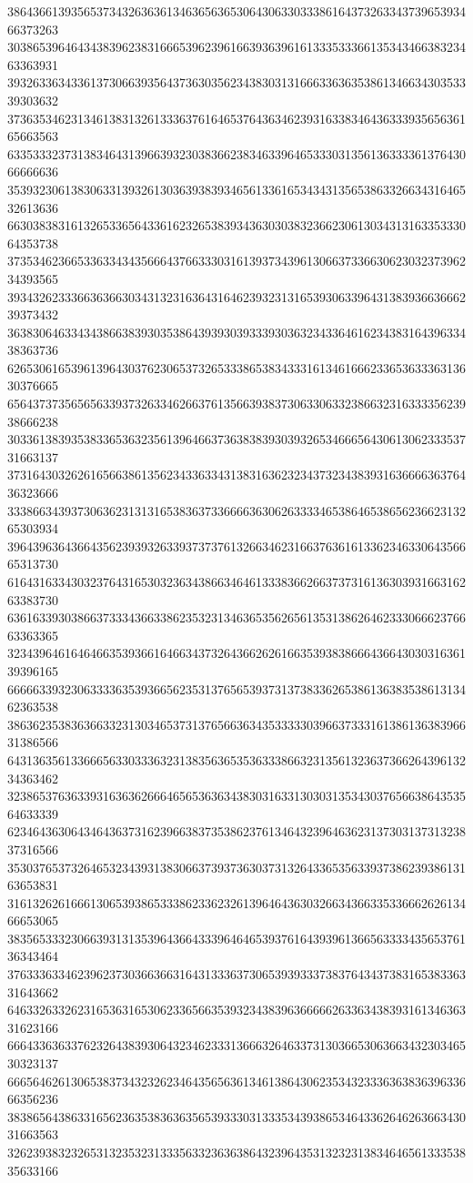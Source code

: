 38643661393565373432636361346365636530643063303338616437326334373965393466373263
30386539646434383962383166653962396166393639616133353336613534346638323463363931
39326336343361373066393564373630356234383031316663363635386134663430353339303632
37363534623134613831326133363761646537643634623931633834643633393565636165663563
63353332373138346431396639323038366238346339646533303135613633336137643066666636
35393230613830633139326130363938393465613361653434313565386332663431646532613636
66303838316132653365643361623265383934363030383236623061303431316335333064353738
37353462366533633434356664376633303161393734396130663733663062303237396234393565
39343262333663636630343132316364316462393231316539306339643138393663666239373432
36383064633434386638393035386439393039333930363234336461623438316439633438363736
62653061653961396430376230653732653338653834333161346166623365363336313630376665
65643737356565633937326334626637613566393837306330633238663231633335623938666238
30336138393538336536323561396466373638383930393265346665643061306233353731663137
37316430326261656638613562343363343138316362323437323438393163666636376436323666
33386634393730636231313165383637336666363062633334653864653865623662313265303934
39643963643664356239393263393737376132663462316637636161336234633064356665313730
61643163343032376431653032363438663464613338366266373731613630393166316263383730
63616339303866373334366338623532313463653562656135313862646233306662376663363365
32343964616464663539366164663437326436626261663539383866643664303031636139396165
66666339323063333635393665623531376565393731373833626538613638353861313462363538
38636235383636633231303465373137656636343533333039663733316138613638396631386566
64313635613366656330333632313835636535363338663231356132363736626439613234363462
32386537636339316363626664656536363438303163313030313534303765663864353564633339
62346436306434643637316239663837353862376134643239646362313730313731323837316566
35303765373264653234393138306637393736303731326433653563393738623938613163653831
31613262616661306539386533386233623261396464363032663436633533666262613466653065
38356533323066393131353964366433396464653937616439396136656333343565376136343464
37633363346239623730366366316431333637306539393337383764343738316538336331643662
64633263326231653631653062336566353932343839636666626336343839316134636331623166
66643363633762326438393064323462333136663264633731303665306366343230346530323137
66656462613065383734323262346435656361346138643062353432333636383639633666356236
38386564386331656236353836363565393330313335343938653464336264626366343031663563
32623938323265313235323133356332363638643239643531323231383464656133353835633166

